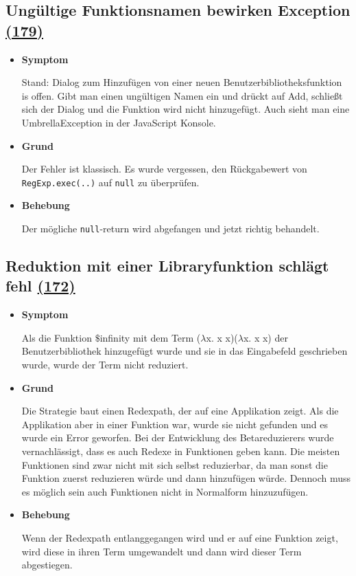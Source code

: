 \documentclass[parskip=full,11pt,twoside]{scrartcl}
\newcommand{\issueref}[1]{
    \href{https://git.scc.kit.edu/ap/Aurora/issues/#1}{(#1)}
}
\newcommand{\regrtest}[5]{
    \subsection{#1 \issueref{#2}}
    \begin{itemize}
        \item \textbf{Symptom}
            #3
        \item \textbf{Grund}
            #4
        \item \textbf{Behebung}
            #5
    \end{itemize}
}
\begin{document}
    \regrtest{Ungültige Funktionsnamen bewirken Exception}{179}{
        Stand: Dialog zum Hinzufügen von einer neuen Benutzerbibliotheksfunktion is offen.
        Gibt man einen ungültigen Namen ein und drückt auf Add, schließt sich der Dialog und die Funktion wird nicht hinzugefügt.
        Auch sieht man eine UmbrellaException in der JavaScript Konsole.
    }{
        Der Fehler ist klassisch. Es wurde vergessen, den Rückgabewert von \texttt{RegExp.exec(..)} auf \texttt{null} zu überprüfen.
    }{
        Der mögliche \texttt{null}-return wird abgefangen und jetzt richtig behandelt.
    }

    \regrtest{Reduktion mit einer Libraryfunktion schlägt fehl}{172}{
        Als die Funktion $\$$infinity mit dem Term ($\lambda$x. x x)($\lambda$x. x x) der
        Benutzerbibliothek hinzugefügt wurde und sie in
        das Eingabefeld geschrieben wurde, wurde der Term nicht reduziert.
    }{
        Die Strategie baut einen Redexpath, der auf eine Applikation zeigt.
        Als die Applikation aber in einer Funktion war, wurde sie nicht gefunden und es wurde ein Error geworfen.
        Bei der Entwicklung des Betareduzierers wurde vernachlässigt, dass es auch Redexe in Funktionen geben kann.
        Die meisten Funktionen sind zwar nicht mit sich selbst reduzierbar, da man sonst die Funktion zuerst reduzieren würde und dann hinzufügen würde.
        Dennoch muss es möglich sein auch Funktionen nicht in Normalform hinzuzufügen.
    }{
        Wenn der Redexpath entlanggegangen wird und er auf eine Funktion zeigt, wird diese in ihren Term umgewandelt und dann wird dieser Term abgestiegen.
    }
\end{document}
